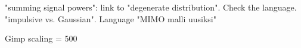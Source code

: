 "summing signal powers": link to "degenerate distribution". Check the language.
"impulsive vs. Gaussian". Language
"MIMO malli uusiksi"

Gimp scaling = 500 
